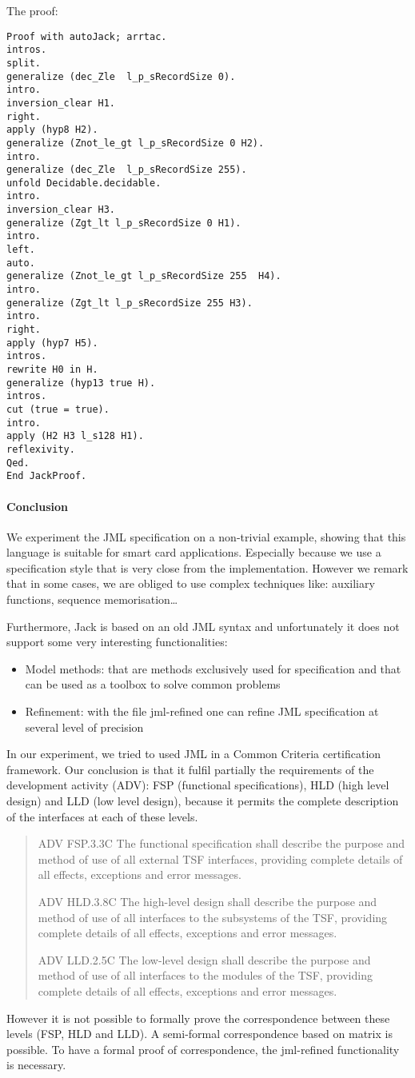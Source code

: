 The proof:
\begin{lstlisting}
Proof with autoJack; arrtac.
intros.
split.
generalize (dec_Zle  l_p_sRecordSize 0).
intro.
inversion_clear H1.
right.
apply (hyp8 H2).
generalize (Znot_le_gt l_p_sRecordSize 0 H2).
intro.
generalize (dec_Zle  l_p_sRecordSize 255).
unfold Decidable.decidable.
intro.
inversion_clear H3.
generalize (Zgt_lt l_p_sRecordSize 0 H1).
intro.
left.
auto.
generalize (Znot_le_gt l_p_sRecordSize 255  H4).
intro.
generalize (Zgt_lt l_p_sRecordSize 255 H3).
intro.
right.
apply (hyp7 H5).
intros.
rewrite H0 in H.
generalize (hyp13 true H).
intros.
cut (true = true).
intro.
apply (H2 H3 l_s128 H1).
reflexivity.
Qed.
End JackProof.
\end{lstlisting}
\paragraph{Conclusion}
We experiment the JML specification on a non-trivial example, showing that this language is suitable for smart card applications. Especially because we use a specification style that is very close from the implementation. However we remark that in some cases, we are obliged to use complex techniques like: auxiliary functions, sequence memorisation\ldots


Furthermore, Jack is based on an old JML syntax and unfortunately it
does not support some very interesting functionalities:
\begin{itemize}
\item Model methods: that are methods exclusively used for specification and that can be used as a toolbox to solve common problems

\item Refinement: with the file jml-refined one can refine JML
specification at several level of precision
\end{itemize}
In our experiment, we tried to used JML in a Common Criteria
certification framework. Our conclusion is that it fulfil partially
the requirements of the development activity (ADV): FSP (functional
specifications), HLD (high level design) and LLD (low level design),
because it permits the complete description of the interfaces at each
of these levels.

\begin{quote}
ADV FSP.3.3C The functional specification shall describe the
purpose and method of use of all external TSF
interfaces, providing complete details of all effects,
exceptions and error messages.

ADV HLD.3.8C The high-level design shall describe the purpose
and method of use of all interfaces to the subsystems
of the TSF, providing complete details
of all effects, exceptions and error messages.

ADV LLD.2.5C The low-level design shall describe the purpose
and method of use of all interfaces to the modules
of the TSF, providing complete details of
all effects, exceptions and error messages.
\end{quote}
However it is not possible to formally prove the correspondence between these levels (FSP, HLD and LLD). A semi-formal correspondence based on matrix is possible. To have a formal proof of correspondence, the jml-refined functionality is necessary.    

